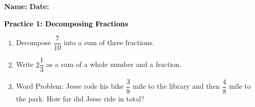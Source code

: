 \documentclass[12pt, letterpaper, fleqn]{article}
\begin{document}
\textbf{Name:} \underline{\hspace{5cm}}
\hfill
\textbf{Date:} \underline{\hspace{3cm}}\\

\begin{tcolorbox}[colback=customteal!20]
    \large\textcolor{black}{\textbf{Practice 1: Decomposing Fractions}}
\end{tcolorbox}
\begin{enumerate}[itemsep=3.5cm, leftmargin=0.6cm]
\item Decompose $\dfrac{7}{10}$ into a sum of three fractions.
\vspace{3.5cm}
\item Write $2\dfrac{1}{3}$ as a sum of a whole number and a fraction.
\vspace{3.5cm}
\item Word Problem: Jesse rode his bike $\dfrac{3}{8}$ mile to the library and then $\dfrac{4}{8}$ mile to the park. How far did Jesse ride in total?
\end{enumerate}
\end{document}
